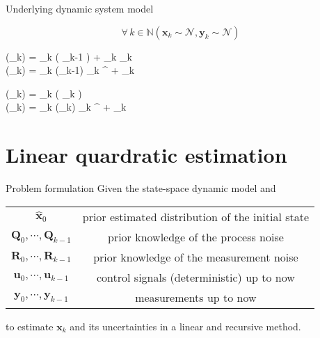 \documentclass[utf-8, 10pt, aspectratio=1610]{beamer}
\begin{document}
\begin{frame}[allowframebreaks]{Underlying dynamic system model}
	\framebreak
	\begin{corollary}[]
		\begin{equation}
			\forall\,k \in \mathbb{N} \left(\mathbf{x}_k \sim \mathcal{N}, \mathbf{y}_k\sim \mathcal{N} \right)
		\end{equation}
		\begin{minipage}[t]{0.48\textwidth}
			\vspace*{-2em}
			\begin{numcases}{}
				\left(_k\right) = _k \left( _{k-1} \right) + _k _k \\
				\left(_k\right) = _k \left(_{k-1}\right) _k ^{} + _k
			\end{numcases}
		\end{minipage}
		\hfill
		\begin{minipage}[t]{0.48\textwidth}
			\vspace*{-2em}
			\begin{numcases}{}
				\left(_k\right) = _k \left( _{k} \right) \\
				\left(_k\right) = _k \left(_{k}\right) _k ^{} + \mathbf{R}_k
			\end{numcases}
		\end{minipage}
	\end{corollary}
\end{frame}

\section{Linear quardratic estimation}

\begin{frame}{Problem formulation}
	Given the state-space dynamic model and
	\begin{table}
		\begin{tabular}{cc}
			\toprule
			\(\hat{\mathbf{x}}_0\)                     & prior estimated distribution of the initial state \\
			\(\mathbf{Q}_0, \cdots, \mathbf{Q}_{k-1}\) & prior knowledge of the process noise              \\
			\(_0, \cdots, \mathbf{R}_{k-1}\) & prior knowledge of the measurement noise          \\
			\(\mathbf{u}_0, \cdots, \mathbf{u}_{k-1}\) & control signals (deterministic) up to now         \\
			\(\mathbf{y}_0, \cdots, \mathbf{y}_{k-1}\) & measurements up to now                            \\
			\bottomrule
		\end{tabular}
	\end{table}
	to estimate \(\mathbf{x}_{k}\) and its uncertainties in a linear and recursive method.
\end{frame}
\end{document}
